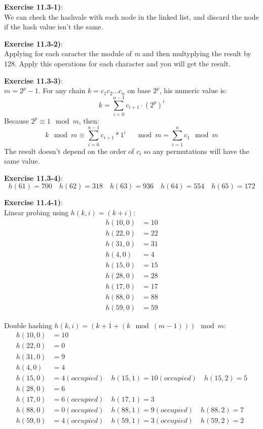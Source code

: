 \documentclass{article}
\newcounter{exercise}[section]   %
\begin{document}
\textbf{Exercise 11.3-1)}:\\
We can check the hashvale with each node in the linked list, and discard the node if the 
hash value isn't the same.

\textbf{Exercise 11.3-2)}:\\
Applying for each caracter the module of \textit{m} and then multyplying the result by
128. Apply this operations for each character and you will get the result.

\textbf{Exercise 11.3-3)}:\\
\(m = 2^p - 1\). For any chain \(k = c_1c_2...c_n\) on base \(2^p\), his numeric value is:
\[
k = \sum_{i = 0}^{n - 1} c_{i + 1} \cdot (2^p)^i
\]
Because \(2^p \equiv 1 \mod m\), then:
\[
k \mod m \equiv \sum_{i = 0}^{n - 1} c_{i + 1} * 1^i \quad \mod m = \sum_{i = 1}^{n} c_1
\mod m
\]
The result doesn't depend on the order of \(c_i\) so any permutations will have the same
value.

\textbf{Exercise 11.3-4)}:
\[
h(61) = 700 \quad h(62) = 318 \quad h(63) = 936 \quad h(64) = 554 \quad h(65) = 172
\]

\textbf{Exercise 11.4-1)}:\\
Linear probing using \(h(k, i) = (k + i)\):
\begin{align*}
    h(10, 0) &= 10\\
    h(22, 0) &= 22\\
    h(31, 0) &= 31\\
    h(4, 0) &= 4\\
    h(15, 0) &= 15\\
    h(28, 0) &= 28\\
    h(17, 0) &= 17\\
    h(88, 0) &= 88\\
    h(59, 0) &= 59
\end{align*}

Double hashing \(h(k, i) = (k + 1 + (k \mod (m - 1))) \mod m\):
\begin{align*}
    h(10, 0) &= 10\\
    h(22, 0) &= 0\\
    h(31, 0) &= 9\\
    h(4, 0) &= 4\\
    h(15, 0) &= 4 (occupied) \quad h(15, 1) = 10 (occupied) \quad h(15, 2) = 5\\
    h(28, 0) &= 6\\
    h(17, 0) &= 6 (occupied) \quad h(17, 1) = 3\\
    h(88, 0) &= 0 (occupied) \quad h(88, 1) = 9 (occupied) \quad h(88, 2) = 7\\
    h(59, 0) &= 4 (occupied) \quad h(59, 1) = 3 (occupied) \quad h(59, 2) = 2
\end{align*}
\end{document}
